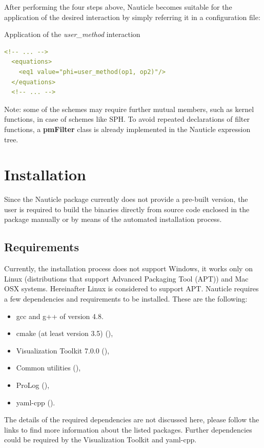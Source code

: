 \documentclass[a4paper,12pt,openany]{book}
\newcommand{\myhref}[3][nauticlegreen_dark]{\href{#2}{\color{#1}{#3}}}%
\theoremstyle{break}
\begin{document}
After performing the four steps above, Nauticle becomes suitable for the application of the desired interaction by simply referring it in a configuration file:
\begin{example}{Application of the \textit{user\_method} interaction}{}
\lstset{basicstyle=\tiny}
\begin{lstlisting}[language=YAML]
  <!-- ... -->
  <equations>
    <eq1 value="phi=user_method(op1, op2)"/>
  </equations>
  <!-- ... -->
\end{lstlisting}
\end{example}

Note: some of the schemes may require further mutual members, such as kernel functions, in case of schemes like SPH. To avoid repeated declarations of filter functions, a \textbf{pmFilter} class is already implemented in the Nauticle expression tree.


\section{Installation}
Since the Nauticle package currently does not provide a pre-built version, the user is required to build the binaries directly from source code enclosed in the package manually or by means of the automated installation process.
\subsection{Requirements}
Currently, the installation process does not support Windows, it works only on Linux (distributions that support Advanced Packaging Tool (APT)) and Mac OSX systems. Hereinafter Linux is considered to support APT.
Nauticle requires a few dependencies and requirements to be installed. These are the following:
\begin{itemize}
  \item gcc and g++ of version 4.8.
  \item cmake (at least version 3.5) (\myhref{https://cmake.org/download/}{https://cmake.org/download/}),
  \item Visualization Toolkit 7.0.0 (\myhref{http://www.vtk.org/files/release/7.0/VTK-7.0.0.zip}{http://www.vtk.org/files/release/7.0/VTK-7.0.0.zip}),
  \item Common utilities (\myhref{https://bitbucket.org/BalazsToth/commonutils}{https://bitbucket.org/BalazsToth/commonutils}),
  \item ProLog (\myhref{https://bitbucket.org/BalazsToth/prolog}{https://bitbucket.org/BalazsToth/prolog}),
  \item yaml-cpp (\myhref{https://github.com/jbeder/yaml-cpp}{https://github.com/jbeder/yaml-cpp}).
\end{itemize}
The details of the required dependencies are not discussed here, please follow the links to find more information about the listed packages. Further dependencies could be required by the Visualization Toolkit and yaml-cpp.
\end{document}
